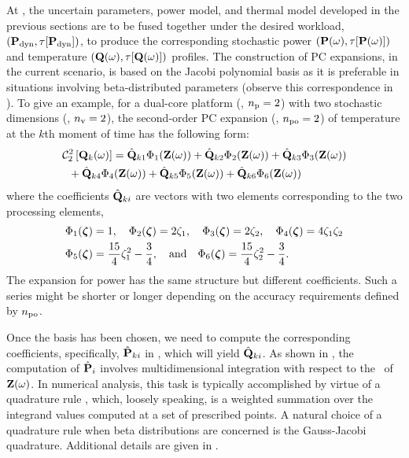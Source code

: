 At , the uncertain parameters, power model, and thermal model developed in the previous sections are to be fused together under the desired workload, $\profilePdyn$, to produce the corresponding stochastic power $\profileP{\o}$ and temperature $\profileT{\o}$ profiles.
The construction of PC expansions, in the current scenario, is based on the Jacobi polynomial basis as it is preferable in situations involving beta-distributed parameters \cite{xiu2010} (observe this correspondence in ).
To give an example, for a dual-core platform (\ie, ${n_\text{p}} = 2$) with two stochastic dimensions (\ie, ${n_\text{v}} = 2$), the second-order PC expansion (\ie, ${n_\text{po}} = 2$) of temperature at the $k$th moment of time has the following form:
\begin{align}
  & \oPC{2}{2}{\vTO_k(\o)} = \pcc{\vTO}_{k1} \pcb_1(\vZ(\o)) + \pcc{\vTO}_{k2} \pcb_2(\vZ(\o)) + \pcc{\vTO}_{k3} \pcb_3(\vZ(\o)) \nonumber \\
  & {} \; \; + \pcc{\vTO}_{k4} \pcb_4(\vZ(\o)) + \pcc{\vTO}_{k5} \pcb_5(\vZ(\o)) + \pcc{\vTO}_{k6} \pcb_6(\vZ(\o)) \elabel{pc-example}
\end{align}
where the coefficients $\hat{\mathbf{Q}}_{ki}$ are vectors with two elements corresponding to the two processing elements,
\begin{align*}
  & \Phi_1(\boldsymbol{\zeta}) = 1, \hspace{1em} \Phi_2(\boldsymbol{\zeta}) = 2 \zeta_1, \hspace{1em} \Phi_3(\boldsymbol{\zeta}) = 2 \zeta_2, \hspace{1em} \Phi_4(\boldsymbol{\zeta}) = 4 \zeta_1 \zeta_2 \\
  & \Phi_5(\boldsymbol{\zeta}) = \frac{15}{4} \zeta_1^2 - \frac{3}{4}, \hspace{1em} \text{and} \hspace{1em} \Phi_6(\boldsymbol{\zeta}) = \frac{15}{4} \zeta_2^2 - \frac{3}{4}.
\end{align*}
The expansion for power has the same structure but different coefficients.
Such a series might be shorter or longer depending on the accuracy requirements defined by ${n_\text{po}}$.

Once the basis has been chosen, we need to compute the corresponding coefficients, specifically, $\hat{\mathbf{P}}_{ki}$ in , which will yield $\hat{\mathbf{Q}}_{ki}$.
As shown in , the computation of $\hat{\mathbf{P}}_i$ involves multidimensional integration with respect to the \pdf\ of $\mathbf{Z}(\omega)$.
In numerical analysis, this task is typically accomplished by virtue of a quadrature rule \cite{press2007}, which, loosely speaking, is a weighted summation over the integrand values computed at a set of prescribed points.
A natural choice of a quadrature rule when beta distributions are concerned is the Gauss-Jacobi quadrature.
Additional details are given in .

